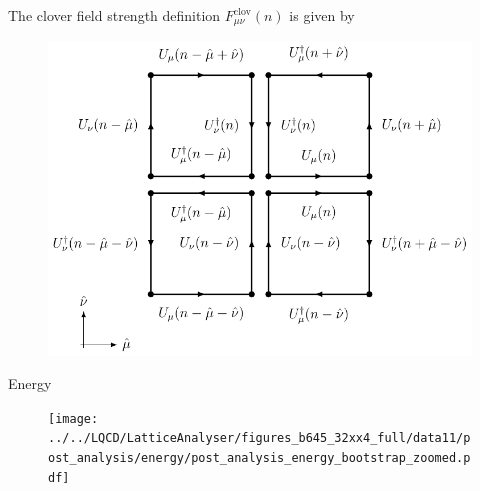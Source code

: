 \documentclass[10pt,show notes on second screen]{beamer}
\begin{document}
\begin{frame}{The clover field strength definition}
$F_{\mu \nu}^\mathrm{clov}(n)$ is given by
\begin{figure}
    \centering
    \includegraphics[scale=0.7]{../figures/illustrations/lqcd/clover/clover}
\end{figure}
\end{frame}

\begin{frame}{Energy}
\vspace{-10.0pt}
\begin{figure}
    \centering
    \texttt{[image: ../../LQCD/LatticeAnalyser/figures\_b645\_32xx4\_full/data11/post\_analysis/energy/post\_analysis\_energy\_bootstrap\_zoomed.pdf]}
\end{figure}
\end{frame}
\end{document}
